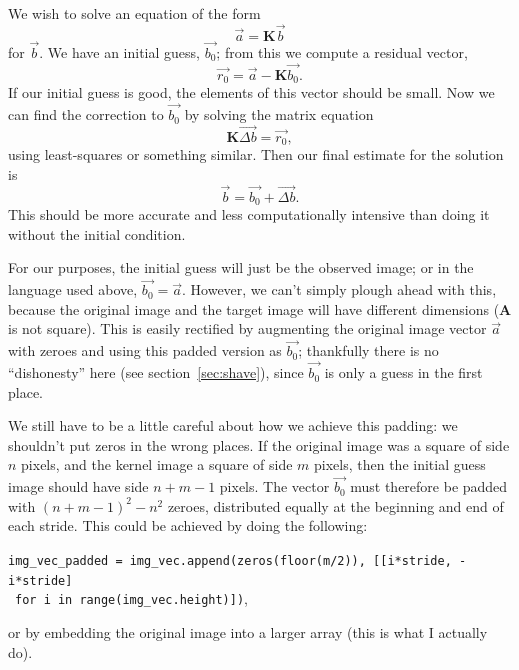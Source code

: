 \documentclass[letterpaper, 11pt]{article}
\begin{document}
We wish to solve an equation of the form
\begin{equation}
	\vec{a} = \mathbf{K}\vec{b}
\end{equation}
for $\vec b$. We have an initial guess, $\vec{b_0}$; from this we compute a residual vector,
\begin{equation}
	\vec{r_0} = \vec{a} - \mathbf{K}\vec{b_0}.
\end{equation}
If our initial guess is good, the elements of this vector should be small. Now we can find the correction to $\vec{b_0}$ by solving the matrix equation
\begin{equation}
	\mathbf{K}\vec{\Delta b} = \vec{r_0},
\end{equation}
using least-squares or something similar. Then our final estimate for the solution is
\begin{equation}
	\vec{b} = \vec{b_0} + \vec{\Delta b}.
\end{equation}
This should be more accurate and less computationally intensive than doing it without the initial condition.

For our purposes, the initial guess will just be the observed image; or in the language used above, $\vec{b_0}=\vec{a}$. However, we can't simply plough ahead with this, because the original image and the target image will have different dimensions ($\mathbf A$ is not square). This is easily rectified by augmenting the original image vector $\vec a$ with zeroes and using this padded version as $\vec{b_0}$; thankfully there is no ``dishonesty'' here (see section~\ref{sec:shave}), since $\vec{b_0}$ is only a guess in the first place.

We still have to be a little careful about how we achieve this padding: we shouldn't put zeros in the wrong places. If the original image was a square of side $n$ pixels, and the kernel image a square of side $m$ pixels, then the initial guess image should have side $n+m-1$ pixels. The vector $\vec{b_0}$ must therefore be padded with $(n+m-1)^2-n^2$ zeroes, distributed equally at the beginning and end of each stride. This could be achieved by doing the following:

\texttt{img\_vec\_padded = img\_vec.append(zeros(floor(m/2)), [[i*stride, -i*stride] }\\~\mbox{}\hspace{10cm}\texttt{for i in range(img\_vec.height)])},

or by embedding the original image into a larger array (this is what I actually do).
\end{document}
